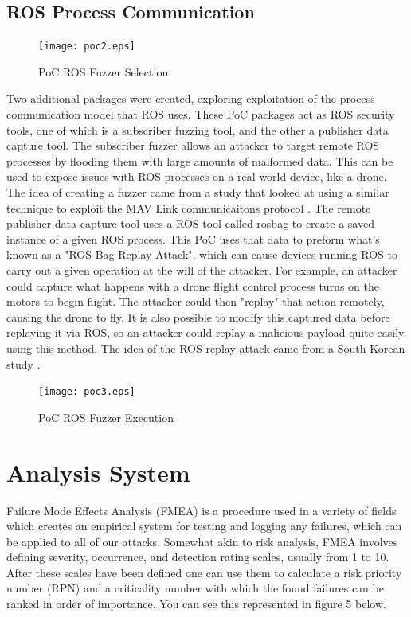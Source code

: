 \documentclass[IEEEtran,letterpaper,10pt,notitlepage,draftclsnofoot]{article}
\begin{document}
\subsection{ROS Process Communication}
\begin{figure}[H]
  \centering
    \texttt{[image: poc2.eps]}
    \caption{PoC ROS Fuzzer Selection}
\end{figure}

Two additional packages were created, exploring exploitation of the process communication model that ROS uses. These PoC packages act as ROS security tools, one of which is a subscriber
fuzzing tool, and the other a publisher data capture tool. The subscriber fuzzer allows an attacker to target remote ROS processes by flooding them with large amounts of malformed data.
This can be used to expose issues with ROS processes on a real world device, like a drone. The idea of creating a fuzzer came from a study that looked at using a similar technique to exploit the MAV Link communicaitons protocol \cite{ROSMAVFuzz}.
The remote publisher data capture tool uses a ROS tool called rosbag to create a saved instance
of a given ROS process. This PoC uses that data to preform what's known as a "ROS Bag Replay Attack", which can cause devices running ROS to carry out a given operation at the will of the attacker.
For example, an attacker could capture what happens with a drone flight control process turns on the motors to begin flight. The attacker could then "replay" that action remotely, causing the drone
to fly. It is also possible to modify this captured data before replaying it via ROS, so an attacker could replay a malicious payload quite easily using this method. The idea of the ROS replay attack came from a
South Korean study \cite{ROSVulnCounter}.

\begin{figure}[H]
  \centering
    \texttt{[image: poc3.eps]}
    \caption{PoC ROS Fuzzer Execution}
\end{figure}

\section{Analysis System}
Failure Mode Effects Analysis (FMEA) is a procedure used in a variety of fields which creates an empirical system for testing and logging any failures, which can be applied to all of our attacks. \cite{FMEA}
Somewhat akin to risk analysis, FMEA involves defining severity, occurrence, and detection rating scales, usually from 1 to 10.
After these scales have been defined one can use them to calculate a risk priority number (RPN) and a criticality number with which the found failures can be ranked in order of importance.
You can see this represented in figure 5 below.
\end{document}
